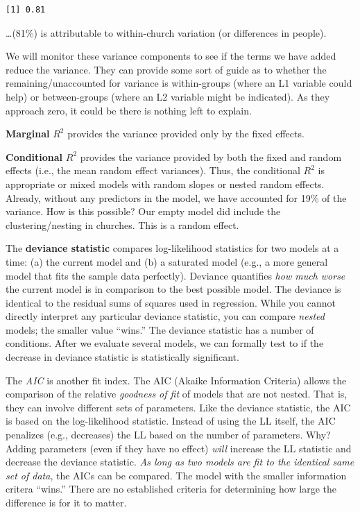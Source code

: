 \documentclass[
  english,
]{book}
\begin{document}
\begin{verbatim}
[1] 0.81
\end{verbatim}

\ldots(81\%) is attributable to within-church variation (or differences in people).

We will monitor these variance components to see if the terms we have added reduce the variance. They can provide some sort of guide as to whether the remaining/unaccounted for variance is within-groups (where an L1 variable could help) or between-groups (where an L2 variable might be indicated). As they approach zero, it could be there is nothing left to explain.

\textbf{Marginal} \(R^2\) provides the variance provided only by the fixed effects.

\textbf{Conditional} \(R^2\) provides the variance provided by both the fixed and random effects (i.e., the mean random effect variances). Thus, the conditional \(R^2\) is appropriate or mixed models with random slopes or nested random effects. Already, without any predictors in the model, we have accounted for 19\% of the variance. How is this possible? Our empty model did include the clustering/nesting in churches. This is a random effect.

The \textbf{deviance statistic} compares log-likelihood statistics for two models at a time: (a) the current model and (b) a saturated model (e.g., a more general model that fits the sample data perfectly). Deviance quantifies \emph{how much worse} the current model is in comparison to the best possible model. The deviance is identical to the residual sums of squares used in regression. While you cannot directly interpret any particular deviance statistic, you can compare \emph{nested} models; the smaller value ``wins.'' The deviance statistic has a number of conditions. After we evaluate several models, we can formally test to if the decrease in deviance statistic is statistically significant.

The \emph{AIC} is another fit index. The AIC (Akaike Information Criteria) allows the comparison of the relative \emph{goodness of fit} of models that are not nested. That is, they can involve different sets of parameters. Like the deviance statistic, the AIC is based on the log-likelihood statistic. Instead of using the LL itself, the AIC penalizes (e.g., decreases) the LL based on the number of parameters. Why? Adding parameters (even if they have no effect) \emph{will} increase the LL statistic and decrease the deviance statistic. \emph{As long as two models are fit to the identical same set of data}, the AICs can be compared. The model with the smaller information critera ``wins.'' There are no established criteria for determining how large the difference is for it to matter.
\end{document}
